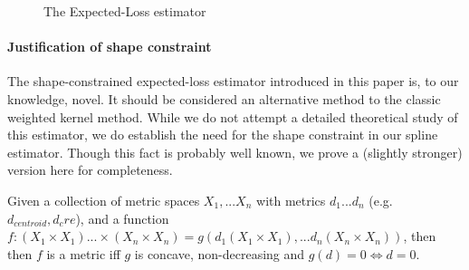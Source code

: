 \begin{figure}[H]
\begin{comment}
%
\coordinate[below=4mm of n1.south] (aux1);
%
   \end{tikzpicture}
   }
\newline
\end{comment}
\begin{comment}
\begin{tabular}[t]{cc}
\subfloat[]{
    \texttt{[image: figs/figsforpres/315\_summary\_scatter.png]}
    \caption{Isocortex loss distribution}
    \label{fig:my_label} 
    }
    &
    \subfloat[]{
    \texttt{[image: figs/figsforpres/315\_summary\_surface.png]}
    \caption{$\hat g$ fit to expected-loss using shape-constrained splines}
    \label{fig:my_label}
    }
    \end{tabular}
\end{comment}
 \caption{The Expected-Loss estimator}
 \end{figure}


\newpage
\paragraph{Justification of shape constraint}

The shape-constrained expected-loss estimator introduced in this paper is, to our knowledge, novel.
It should be considered an alternative method to the classic weighted kernel method.
While we do not attempt a detailed theoretical study of this estimator, we do establish the need for the shape constraint in our spline estimator.
Though this fact is probably well known, we prove a (slightly stronger) version here for completeness.

Given a collection of metric spaces $X_1, ... X_n$ with metrics $d_1 ... d_n$ (e.g. $d_{centroid}, d_cre$), and a function $f: (X_1 \times X_1) ... \times (X_n  \times X_n) = g(d_1(X_1 \times X_1),... d_n(X_n \times X_n))$, then then $f$ is a metric iff $g$ is concave, non-decreasing and $g(d) = 0 \Longleftrightarrow d = 0$.

